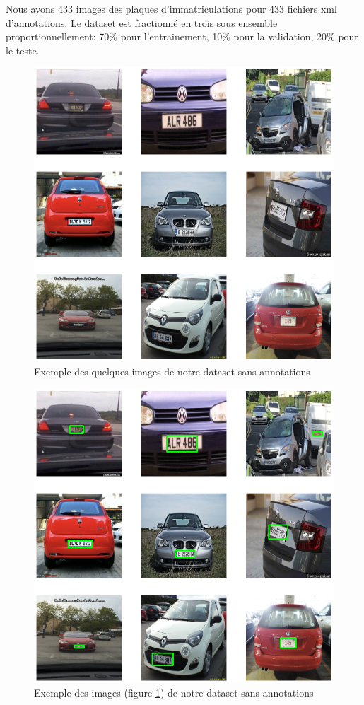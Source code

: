 	Nous avons 433 images des plaques d’immatriculations pour 433 fichiers xml d’annotations.
	Le dataset est  fractionné en trois sous ensemble proportionnellement: 70\% pour l’entrainement, 10\% pour la validation, 20\% pour le teste.

	
	\begin{figure}[H]%
		\centering
		\includegraphics[width=\textwidth]{images/image_plate}
		\caption{Exemple des quelques images de notre dataset sans annotations }
		\label{fig:image_without_annotations}
	\end{figure}
	
	\begin{figure}[H]%
		\centering
		\includegraphics[width=\textwidth]{images/image_annotation}
		\caption{Exemple des images (figure \ref{fig:image_without_annotations}) de notre dataset sans annotations }
		\label{fig:image_with_annotations}
	\end{figure}

